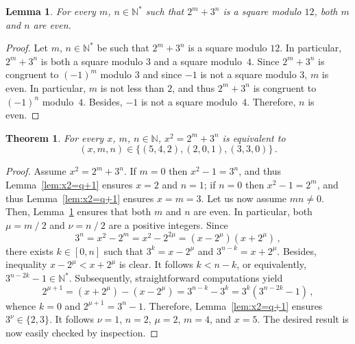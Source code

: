 \documentclass[12pt]{article}
\newcommand{\bZ}{\mathbb{Z}}
\newcommand{\bN}{\mathbb{N}} %
\newcommand{\bNast}{\bN^*}
\newcommand{\binover}{\mathbin{/}}
\newtheorem{theorem}{Theorem}
\newtheorem{lemma}{Lemma}
\theoremstyle{definition}
\begin{document}
   

   
   \begin{lemma} \label{lem:2m+3n-square-mod-12}
     For every $m$, $n \in \bNast$ such that $2^m + 3^n$ is a square modulo $12$,
     both $m$ and $n$ are even.
   \end{lemma}

   \begin{proof}
     Let $m$, $n \in \bNast$ be such that $2^m + 3^n$ is a square modulo $12$.
     In particular, $2^m + 3^n$ is both a square modulo $3$ and a square modulo~$4$.
     Since $2^m + 3^n$ is congruent to ${(- 1)}^m$ modulo $3$ and since $- 1$ is not a square modulo $3$,
     $m$ is even.
     In particular, $m$ is not less than $2$, and thus $2^m + 3^n$ is congruent to ${(- 1)}^n$ modulo~$4$.
     Besides, $- 1$ is not a square modulo~$4$.
     Therefore, $n$ is even.
   \end{proof}

   \begin{theorem}
     For every $x$, $m$, $n \in \bN$,
     $x^2 = 2^m + 3^n$ is equivalent to
     $$
     (x, m, n) \in \{  (5, 4, 2), (2, 0, 1), (3, 3, 0) \} \, .
     $$
   \end{theorem}
   
   \begin{proof}
     Assume $x^2 = 2^m + 3^n$.
     If $m = 0$ then $x^2 - 1 = 3^n$, and thus Lemma~\ref{lem:x2=q+1} ensures $x = 2$ and $n = 1$;
     if $n = 0$ then $x^2 - 1 = 2^m$, and thus Lemma~\ref{lem:x2=q+1} ensures $x = m = 3$.
     Let us now assume $mn \ne 0$.
     Then, Lemma~\ref{lem:2m+3n-square-mod-12} ensures that both $m$ and $n$ are even.
     In particular, both $\mu = m \binover 2$ and $\nu = n \binover 2$ are a positive integers.
     Since 
     $$
     3^n = x^2 - 2^m = x^2 - 2^{2\mu} = (x - 2^\mu)(x + 2^\mu) \,, 
     $$
     there exists $k \in [0, n]$ such that $3^k = x - 2^\mu$ and $3^{n - k} = x + 2^\mu$.
     Besides, inequality $x - 2^\mu < x + 2^\mu$ is clear. 
     It follows $k < n - k$, or equivalently, $3^{n - 2 k} - 1 \in \bNast$.
     Subsequently, straightforward computations yield
     $$
     2^{\mu + 1} = (x + 2^\mu) - (x - 2^\mu) = 3^{n - k} - 3^k = 3^k \left( 3^{n - 2k} - 1 \right) \,,
     $$
     whence $k = 0$ and $2^{\mu + 1} = 3^n - 1$.
     Therefore, 
     Lemma~\ref{lem:x2=q+1} ensures $3^\nu \in \{ 2, 3 \}$.
     It follows $\nu = 1$, $n = 2$, $\mu = 2$, $m = 4$, and $x = 5$.
     The desired result is now easily checked by inspection. 
  \end{proof}
\end{document}
